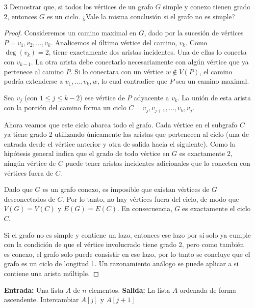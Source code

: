 \begin{ejercicioEntregar}{3}
    Demostrar que, si todos los vértices de un grafo \( G \) simple y conexo tienen grado 2, entonces \( G \) es un ciclo. ¿Vale la misma conclusión si el grafo no es simple?
\end{ejercicioEntregar}
\begin{proof}
    Consideremos un camino maximal en \(G\), dado por la sucesión de vértices \(P = v_1, v_2, \ldots, v_k\).
    Analicemos el último vértice del camino, \(v_k\). Como \(\deg(v_k) = 2\), tiene exactamente dos aristas incidentes. Una de ellas lo conecta con \(v_{k-1}\). La otra arista debe conectarlo necesariamente con algún vértice que ya pertenece al camino \(P\). Si lo conectara con un vértice \(w \notin V(P)\), el camino podría extenderse a \(v_1, \ldots, v_k, w\), lo cual contradice que \(P\) sea un camino maximal.

    Sea \(v_j\) (con \(1 \leq j \leq k-2\)) ese vértice de \(P\) adyacente a \(v_k\). La unión de esta arista con la porción del camino forma un ciclo \(C = v_j, v_{j+1}, \ldots, v_k, v_j\).

    Ahora veamos que este ciclo abarca todo el grafo. Cada vértice en el subgrafo \(C\) ya tiene grado 2 utilizando únicamente las aristas que pertenecen al ciclo (una de entrada desde el vértice anterior y otra de salida hacia el siguiente). Como la hipótesis general indica que el grado de todo vértice en \(G\) es exactamente 2, ningún vértice de \(C\) puede tener aristas incidentes adicionales que lo conecten con vértices fuera de \(C\).

    Dado que \(G\) es un grafo conexo, es imposible que existan vértices de \(G\) desconectados de \(C\). Por lo tanto, no hay vértices fuera del ciclo, de modo que \(V(G) = V(C)\) y \(E(G) = E(C)\). En consecuencia, \(G\) es exactamente el ciclo \(C\).

    Si el grafo no es simple y contiene un lazo, entonces ese lazo por sí solo ya cumple con la condición de que el vértice involucrado tiene grado 2, pero como también es conexo, el grafo solo puede consistir en ese lazo, por lo tanto se concluye que el grafo es un ciclo de longitud 1. Un razonamiento análogo se puede aplicar a si contiene una arista múltiple.
\end{proof}

\begin{algorithm}
    \caption{Bubble Sort}
    \label{alg:bubblesort}
    \begin{algorithmic}[1] %
        \State \textbf{Entrada:} Una lista $A$ de $n$ elementos.
        \State \textbf{Salida:} La lista $A$ ordenada de forma ascendente.
        \vspace{0.2cm}
        \State Intercambiar $A[j]$ y $A[j+1]$
        \EndIf
        \EndFor
        \EndFor
        \EndProcedure
    \end{algorithmic}
\end{algorithm}


